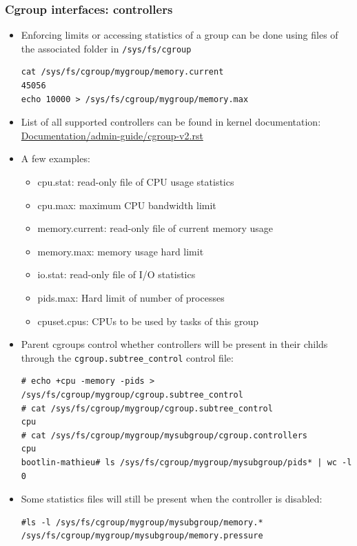 \begin{frame}
	\frametitle{Cgroup interfaces: controllers}
	\begin{itemize}
		\item Enforcing limits or accessing statistics of a group can be done using
			files of the associated folder in \texttt{/sys/fs/cgroup}
			\begin{block}{}
				{\tiny
				\begin{verbatim}
cat /sys/fs/cgroup/mygroup/memory.current
45056
echo 10000 > /sys/fs/cgroup/mygroup/memory.max
\end{verbatim}
}
			\end{block}
		\item List of all supported controllers can be found in kernel
			documentation:
			\href{https://elixir.bootlin.com/linux/v6.18/source/Documentation/admin-guide/cgroup-v2.rst#L1091}{Documentation/admin-guide/cgroup-v2.rst}
		\item A few examples:
			\begin{itemize}
				\item cpu.stat: read-only file of CPU usage statistics
				\item cpu.max: maximum CPU bandwidth limit
				\item memory.current: read-only file of current memory usage
				\item memory.max: memory usage hard limit
				\item io.stat: read-only file of I/O statistics
				\item pids.max: Hard limit of number of processes
				\item cpuset.cpus: CPUs to be used by tasks of this group
			\end{itemize}
		\item Parent cgroups control whether controllers will be present in their
			childs through the \texttt{cgroup.subtree\_control} control file:
			\begin{block}{}
				{\tiny
				\begin{verbatim}
# echo +cpu -memory -pids > /sys/fs/cgroup/mygroup/cgroup.subtree_control
# cat /sys/fs/cgroup/mygroup/cgroup.subtree_control
cpu
# cat /sys/fs/cgroup/mygroup/mysubgroup/cgroup.controllers
cpu
bootlin-mathieu# ls /sys/fs/cgroup/mygroup/mysubgroup/pids* | wc -l
0
\end{verbatim}
}
			\end{block}
		\item Some statistics files will still be present when the controller is
			disabled:
			\begin{block}{}
				{\tiny
				\begin{verbatim}
#ls -l /sys/fs/cgroup/mygroup/mysubgroup/memory.*
/sys/fs/cgroup/mygroup/mysubgroup/memory.pressure
\end{verbatim}
}
			\end{block}
	\end{itemize}
\end{frame}

